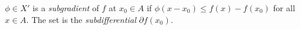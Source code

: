 $\phi\in X'$ is a \emph{subgradient} of $f$ at $x_0\in A$ if $\phi(x-x_0)\leqslant f(x)-f(x_0)$ for all $x\in A$. The set is the \emph{subdifferential} $\partial f(x_0)$.

